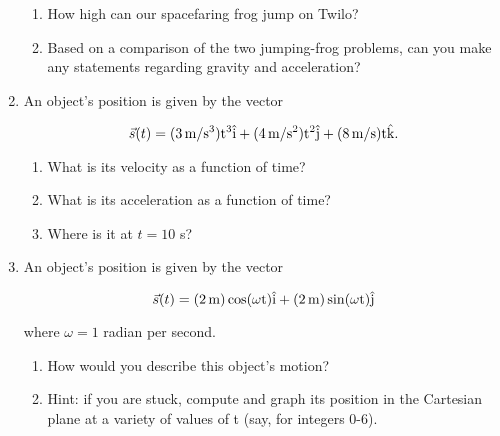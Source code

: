 \documentclass[12pt]{article}
\begin{document}
\begin{enumerate}
\begin{enumerate}
\item How high can our spacefaring frog jump on Twilo?
\item Based on a comparison of the two jumping-frog problems, can you make any statements regarding gravity and acceleration?
\end{enumerate}

\item An object's position is given by the vector 

$$\vec s(t) = (3\,\rm m/\rm s^3) t^3 \hat i + (4\, \rm m/\rm s^2) t^2 \hat j + (8\, \rm m/\rm s) t\hat k.$$

\begin{enumerate}
\item What is its velocity as a function of time?
\item What is its acceleration as a function of time?
\item Where is it at $t=10$ s?
\end{enumerate}

\item An object's position is given by the vector 

$$\vec s(t) = (2\, \rm m) \cos (\omega t) \hat i + (2\, \rm m) \sin (\omega t) \hat j$$

where $\omega = 1$ radian per second.

\begin{enumerate}
\item How would you describe this object's motion? 
\item Hint: if you are stuck, compute and graph its position in the Cartesian plane at a variety of values of t (say, for integers 0-6).
\end{enumerate}
\end{enumerate}
\end{document}

